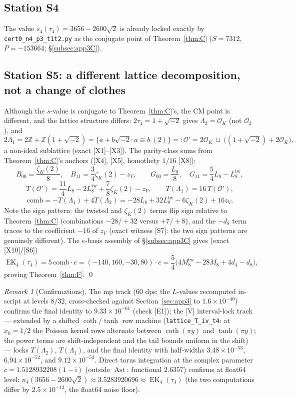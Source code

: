 \documentclass[11pt]{article}
\newcommand{\Zz}{\mathbb{Z}}
\newcommand{\ii}{\mathrm{i}}
\newcommand{\OO}{\mathcal{O}}
\DeclareMathOperator{\EK}{EK}
\DeclareMathOperator{\Ast}{Ast}
\theoremstyle{definition}
\theoremstyle{remark}
\newtheorem{remark}[theorem]{Remark}
\begin{document}
\subsection{Station S4}

The value $s_4(\tau_4)=3656-2600\sqrt2$ is already locked exactly by
\texttt{cert0\_n4\_p3\_t1t2.py} as the conjugate point of
Theorem~\ref{thm:C} ($S=7312$, $P=-153664$;
\S\ref{subsec:app3C}).

\subsection{Station S5: a different lattice decomposition, not a
change of clothes}

Although the $s$-value is conjugate to Theorem~\ref{thm:C}'s, the CM
point is different, and the lattice structure differs:
$2\tau_4=1+\sqrt{-2}$ gives $\Lambda_2=\OO_K$ (not $\OO_2$), and
\[
  2\Lambda_1=2\Zz+\Zz(1+\sqrt{-2})
  =\{a+b\sqrt{-2}:a\equiv b\ (2)\}=:\OO'
  =2\OO_K\ \sqcup\ \bigl((1+\sqrt{-2})+2\OO_K\bigr),
\]
a non-ideal sublattice (exact [X1]--[X3]). The parity-class sums from
Theorem~\ref{thm:C}'s anchors ([X4], [X5], homothety $1/16$ [X8]):
\[
  B_{00}=\frac{\zeta_K(2)}8,\quad B_{11}=\frac34\zeta_K(2)-z_V,\qquad
  G_{00}=\frac{L_8}8,\quad G_{11}=\frac54L_8-L_8^{\mathrm{tw}},
\]
\[
  T(\OO')=\frac{11}{4}L_8-2L_8^{\mathrm{tw}}+\frac78\zeta_K(2)-z_V,
  \qquad T(\Lambda_1)=16\,T(\OO'),
\]
\[
  \mathrm{comb}=-T(\Lambda_1)+4T(\Lambda_2)
  =-28L_8+32L_8^{\mathrm{tw}}-6\zeta_K(2)+16z_V .
\]
Note the sign pattern: the twisted and $\zeta_K(2)$ terms flip sign
relative to Theorem~\ref{thm:C} (combinations $-28/+32$ versus
$+7/+8$), and the $-d_8$ term traces to the coefficient $-16$ of
$z_V$ (exact witness [S7]: the two sign patterns are genuinely
different). The $e$-basis assembly of \S\ref{subsec:app3C} gives
(exact [X10]/[S6])
\[
  \EK_4(\tau_4)=5\,\mathrm{comb}\cdot e=(-140,160,-30,80)\cdot e
  =\frac54\bigl(4M_8^{\mathrm{tw}}-28M_8+4d_4-d_8\bigr),
\]
proving Theorem~\ref{thm:F}. \qed

\begin{remark}[Confirmations]
The mp track (60 dps; the $L$-values recomputed in-script at levels
$8/32$, cross-checked against Section~\ref{sec:app3} to
$1.6\times10^{-40}$) confirms the final identity to
$9.33\times10^{-61}$ (check [E1]); the [V] interval-lock track ---
extended by a shifted $\coth/\tanh$ row machine
(\texttt{lattice\_T\_iv\_t4}: at $x_0=1/2$ the Poisson kernel rows
alternate between $\coth(\pi y)$ and $\tanh(\pi y)$; the power terms
are shift-independent and the tail bounds uniform in the shift) ---
locks $T(\Lambda_2)$, $T(\Lambda_1)$, and the final identity with
half-widths $3.48\times10^{-53}$, $6.94\times10^{-52}$, and
$9.12\times10^{-53}$. Direct torus integration at the complex
parameter $c=1.5128932208(1-\ii)$ (outside $\Ast$: functional
$2.6357$) confirms at float64 level:
$n_4(3656-2600\sqrt2)\approx3.5283920696\approx\EK_4(\tau_4)$
(the two computations differ by $2.5\times10^{-13}$, the float64
noise floor).
\end{remark}
\end{document}

